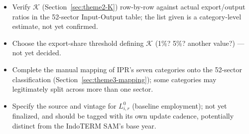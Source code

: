 \documentclass[11pt]{article}
\begin{document}
\begin{itemize}
  \item Verify $\mathcal{K}$ (Section~\ref{sec:theme2-K}) row-by-row against
  actual export/output ratios in the 52-sector Input-Output table; the list
  given is a category-level estimate, not yet confirmed.
  \item Choose the export-share threshold defining $\mathcal{K}$ (1\%? 5\%?
  another value?) --- not yet decided.
  \item Complete the manual mapping of IPR's seven categories onto the
  52-sector classification (Section~\ref{sec:theme3-mapping}); some
  categories may legitimately split across more than one sector.
  \item Specify the source and vintage for $L_{i,r}^0$ (baseline
  employment); not yet finalized, and should be tagged with its own update
  cadence, potentially distinct from the IndoTERM SAM's base year.
\end{itemize}
\end{document}
